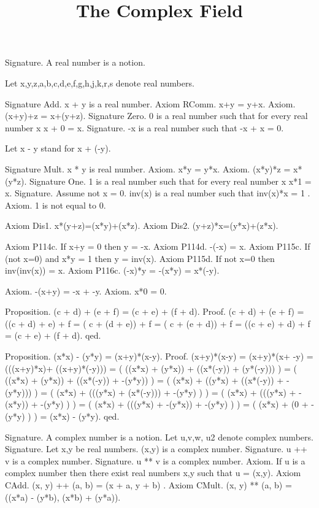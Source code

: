 \documentclass{article}
\newenvironment{forthel}{\begin{leftbar}}{\end{leftbar}}
\begin{document}
\title{The Complex Field}

\maketitle

\begin{forthel}
[set/-s] [element/-s] [number/-s]
Signature. A real number is a notion.


Let x,y,z,a,b,c,d,e,f,g,h,j,k,r,s denote real numbers.



Signature Add. x + y is a real number.
Axiom RComm. x+y = y+x.
Axiom. (x+y)+z = x+(y+z).
Signature Zero. 0 is a real number such that for every real number x x + 0 = x.
Signature. -x is a real number such that -x + x = 0.

Let x - y stand for x + (-y).

Signature Mult. x * y is real number.
Axiom. x*y = y*x.
Axiom. (x*y)*z = x*(y*z).
Signature One. 1 is a real number such that for every real number x x*1 = x.
Signature. Assume not x = 0. inv(x) is a real number such that inv(x)*x = 1 .
Axiom. 1 is not equal to 0.

Axiom Dis1. x*(y+z)=(x*y)+(x*z).
Axiom Dis2. (y+z)*x=(y*x)+(z*x).


Axiom P114c. If x+y = 0 then y = -x.
Axiom P114d. -(-x) = x.
Axiom P115c. If (not x=0) and x*y = 1 then y = inv(x).  
Axiom P115d. If not x=0 then inv(inv(x)) = x.
Axiom P116c. (-x)*y = -(x*y) = x*(-y).

Axiom. -(x+y) = -x + -y. 
Axiom. x*0 = 0. 

Proposition. (c + d) + (e  + f) = (c + e) + (f   + d).
Proof. (c + d) + (e  + f)	= ((c +  d) +  e)  + f 
= ( c + (d  +  e)) + f 
= ( c + (e  +  d)) + f 
= ((c +  e) +  d)  + f 
=  (c +  e) + (f   + d).
qed.

Proposition. (x*x) - (y*y) = (x+y)*(x-y).
Proof. (x+y)*(x-y) 	= (x+y)*(x+ -y) = (((x+y)*x)+ ((x+y)*(-y))) = ( ((x*x) + (y*x)) + ((x*(-y)) + (y*(-y))) )
= ( ((x*x) + (y*x)) + ((x*(-y)) + -(y*y)) )
= ( (x*x) + ((y*x) + ((x*(-y)) + -(y*y))) )
= ( (x*x) + (((y*x) + (x*(-y))) + -(y*y) ) )
= ( (x*x) + (((y*x) + -(x*y)) + -(y*y) ) )
= ( (x*x) + (((y*x) + -(y*x)) + -(y*y) ) )
= ( (x*x) + (0 + -(y*y) ) )
= (x*x) - (y*y).
qed.







Signature. A complex number is a notion.
Let u,v,w, u2 denote complex numbers.
Signature. Let x,y be real numbers. (x,y) is a complex number.
Signature. u ++ v is a complex number.
Signature. u ** v is a complex number.
Axiom. If u is a complex number then there exist real numbers x,y such that u = (x,y).
Axiom CAdd. (x, y) ++ (a, b) = (x + a, y + b) .
Axiom CMult. (x, y) ** (a, b) = ((x*a) - (y*b), (x*b) + (y*a)).





\end{forthel}
\end{document}
